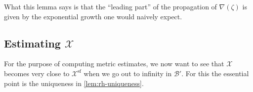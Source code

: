 \documentclass[12pt,letterpaper,reqno]{article}
\numberwithin{equation}{section}
\newcommand{\cB}{\ensuremath{\mathcal B}}
\newcommand{\cX}{\ensuremath{\mathcal X}}
\renewcommand{\sf}{\mathrm{sf}}
\newcommand{\fixme}[1]{{\color{orange}{[#1]}}}
\begin{document}
What this lemma says is that the
``leading part'' of the propagation of $\nabla(\zeta)$ is
given by the exponential growth one would naively expect.

\subsection{Estimating \texorpdfstring{$\cX$}{X}}

For the purpose of computing metric estimates,
we now want to see that $\cX$ becomes very close to $\cX^\sf$
when we go out to infinity in $\cB'$.
For this the essential point is the uniqueness
in \autoref{lem:rh-uniqueness}.

\fixme{integral equations}
\fixme{like Ooguri-Vafa!}

\printbibliography
\end{document}
